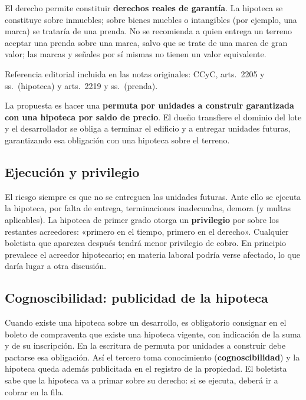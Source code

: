 \documentclass[12pt,oneside]{book}
\begin{document}
El derecho permite constituir \textbf{derechos reales de garantía}. La hipoteca se constituye sobre inmuebles; sobre bienes muebles o intangibles (por ejemplo, una marca) se trataría de una prenda. No se recomienda a quien entrega un terreno aceptar una prenda sobre una marca, salvo que se trate de una marca de gran valor; las marcas y señales por sí mismas no tienen un valor equivalente.

\begin{note}
Referencia editorial incluida en las notas originales: CCyC, arts.~2205 y ss.\ (hipoteca) y arts.~2219 y ss.\ (prenda).
\end{note}

La propuesta es hacer una \textbf{permuta por unidades a construir garantizada con una hipoteca por saldo de precio}. El dueño transfiere el dominio del lote y el desarrollador se obliga a terminar el edificio y a entregar unidades futuras, garantizando esa obligación con una hipoteca sobre el terreno.

\subsection{Ejecución y privilegio}

El riesgo siempre es que no se entreguen las unidades futuras. Ante ello se ejecuta la hipoteca, por falta de entrega, terminaciones inadecuadas, demora (y multas aplicables). La hipoteca de primer grado otorga un \textbf{privilegio} por sobre los restantes acreedores: «primero en el tiempo, primero en el derecho». Cualquier boletista que aparezca después tendrá menor privilegio de cobro. En principio prevalece el acreedor hipotecario; en materia laboral podría verse afectado, lo que daría lugar a otra discusión.

\subsection{Cognoscibilidad: publicidad de la hipoteca}

\begin{important}
Cuando existe una hipoteca sobre un desarrollo, es obligatorio consignar en el boleto de compraventa que existe una hipoteca vigente, con indicación de la suma y de su inscripción. En la escritura de permuta por unidades a construir debe pactarse esa obligación. Así el tercero toma conocimiento (\textbf{cognoscibilidad}) y la hipoteca queda además publicitada en el registro de la propiedad. El boletista sabe que la hipoteca va a primar sobre su derecho: si se ejecuta, deberá ir a cobrar en la fila.
\end{important}
\end{document}
